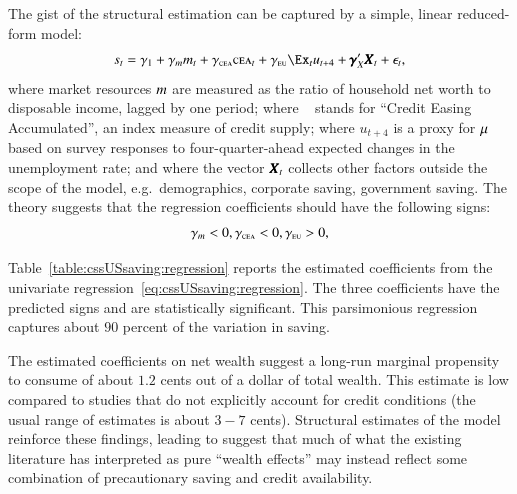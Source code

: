 \documentclass[titlepage,abstract]{\econtex}\newcommand{\texname}{ctDiscrete}
\begin{document}
The gist of the structural estimation can be captured by a simple, linear reduced-form model:
\begin{align}
\label{eq:cssUSsaving:regression}
s_{t} = 
\gamma_{1}
+ \gamma_{\mLev} \mLev_{t} 
+ \gamma_{\CEA} \CEA_{t} 
+ \gamma_{\EU} \Ex_{t} u_{t+4}
+ \VectorCoeff^{\prime}_{X} \VectorX_{t}
+ \epsilon_{t}
,
\end{align}
where market resources $m$ are measured as the ratio of household net worth to disposable income, lagged by one period; 
where \CEA~ stands for ``Credit Easing Accumulated'', an index measure of credit supply; 
where $u_{t+4}$ is a proxy for $\mu$ based on survey responses to  four-quarter-ahead expected changes in the unemployment rate; 
and where the vector $\pmb{X}_{t}$ collects other factors outside the scope of the model, e.g.\ demographics, corporate saving, government saving. 
The theory suggests that the regression coefficients should have the following signs:
\begin{align*}
\gamma_{m} < 0, \gamma_{\textsc{cea}} < 0, \gamma_{\textsc{eu}} > 0
,
\end{align*}


Table~\ref{table:cssUSsaving:regression} reports the estimated coefficients from the univariate regression~\eqref{eq:cssUSsaving:regression}. The three coefficients have the predicted signs and are statistically significant. This parsimonious regression captures about $90$ percent of the variation in saving.


The estimated coefficients on net wealth suggest a long-run marginal
propensity to consume of about $1.2$ cents out of a dollar of total
wealth. This estimate is low compared to studies that do not
explicitly account for credit conditions (the usual range of estimates
is about $3-7$ cents). Structural estimates of the model reinforce
these findings, leading \cite{cssUSsaving} to suggest that much of
what the existing literature has interpreted as pure ``wealth
effects'' may instead reflect some combination of precautionary saving
and credit availability.
\end{document}

